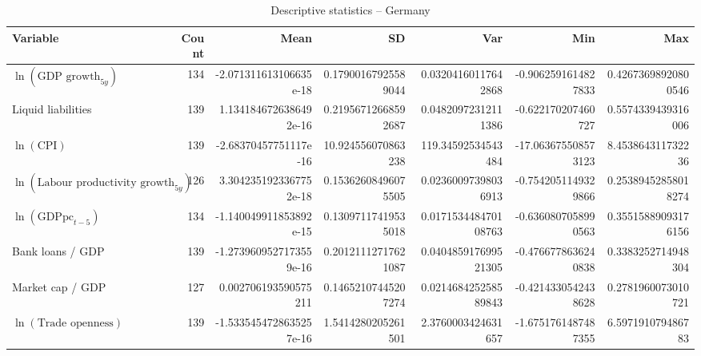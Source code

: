 \begin{table}[!htbp]
\centering
\caption{Descriptive statistics -- Germany}
\footnotesize
\begin{tabular}{lrrrrrr}
\toprule
Variable & Count & Mean & SD & Var & Min & Max \\
\midrule
$\ln(\text{GDP growth}_{5y})$ & 134 & -2.071311613106635e-18 & 0.17900167925589044 & 0.03204160117642868 & -0.9062591614827833 & 0.42673698920800546 \\
Liquid liabilities & 139 & 1.1341846726386492e-16 & 0.21956712668592687 & 0.04820972312111386 & -0.622170207460727 & 0.5574339439316006 \\
$\ln(\text{CPI})$ & 139 & -2.68370457751117e-16 & 10.924556070863238 & 119.34592534543484 & -17.063675508573123 & 8.453864311732236 \\
$\ln(\text{Labour productivity growth}_{5y})$ & 126 & 3.3042351923367752e-18 & 0.15362608496075505 & 0.02360097398036913 & -0.7542051149329866 & 0.25389452858018274 \\
$\ln(\text{GDPpc}_{t-5})$ & 134 & -1.140049911853892e-15 & 0.13097117419535018 & 0.017153448470108763 & -0.6360807058990563 & 0.35515889093176156 \\
Bank loans / GDP & 139 & -1.2739609527173559e-16 & 0.20121112717621087 & 0.040485917699521305 & -0.4766778636240838 & 0.3383252714948304 \\
Market cap / GDP & 127 & 0.002706193590575211 & 0.14652107445207274 & 0.021468425258589843 & -0.4214330542438628 & 0.2781960073010721 \\
$\ln(\text{Trade openness})$ & 139 & -1.5335454728635257e-16 & 1.5414280205261501 & 2.3760003424631657 & -1.6751761487487355 & 6.597191079486783 \\
\bottomrule
\end{tabular}
\end{table}


